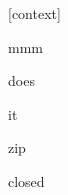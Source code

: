 \documentclass[varwidth]{standalone}
\begin{document}
\begin{CJK*}{UTF8}{gbsn}
{\setlength{\fboxsep}{0pt}\colorbox{white!0}{\parbox{0.9\textwidth}{
\colorbox{red!1.818264370448061e-13}{\strut [context]} \colorbox{red!2.8674804752881755e-09}{\strut mmm} \colorbox{red!3.641518560471013e-05}{\strut does} \colorbox{red!7.376596477115527e-05}{\strut it} \colorbox{red!0.0005512665957212448}{\strut zip} \colorbox{red!99.99934387207031}{\strut closed} 
}}}
\end{CJK*}
\end{document}
